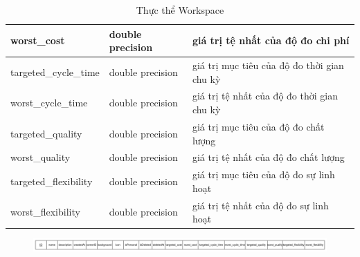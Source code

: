 \begin{center}
\begin{table}[H]
{\begin{tabular}{ |p{3cm} |p{3cm} |p{8cm}|}
                                \hline
                                worst{\_}cost & double precision & giá trị tệ nhất của độ đo chi phí \\
                                \hline
                                targeted{\_}cycle{\_}time & double precision & giá trị mục tiêu của độ đo thời gian chu kỳ \\
                                \hline
                                worst{\_}cycle{\_}time & double precision & giá trị tệ nhất của độ đo thời gian chu kỳ \\
                                \hline
                                targeted{\_}quality & double precision & giá trị mục tiêu của độ đo chất lượng \\
                                \hline
                                worst{\_}quality & double precision & giá trị tệ nhất của độ đo chất lượng \\
                                \hline
                                targeted{\_}flexibility & double precision & giá trị mục tiêu của độ đo sự linh hoạt \\
                                \hline
                                worst{\_}flexibility & double precision & giá trị tệ nhất của độ đo sự linh hoạt \\
                                \hline
                        \end{tabular}
                }
                \caption{Thực thể Workspace}
        \end{table}
\end{center}
\begin{figure}[H]
        \centering
        \includegraphics[width=\textwidth]{Content/Phân tích và thiết kế hệ thống/images/ERD_mapping/workspace_mapping.png}
        \label{fig:Thực thể Workspace}
\end{figure}

\newpage
